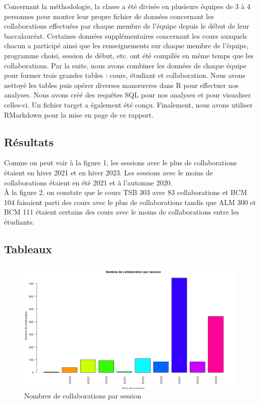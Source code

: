 \documentclass[9pt,twocolumn,twoside,]{pnas-new}
\begin{document}
Concernant la méthodologie, la classe a été divisée en plusieurs équipes
de 3 à 4 personnes pour monter leur propre fichier de données concernant
les collaborations effectuées par chaque membre de l'équipe depuis le
début de leur baccalauréat. Certaines données supplémentaires concernant
les cours auxquels chacun a participé ainsi que les renseignements sur
chaque membre de l'équipe, programme choisi, session de début, etc. ont
été compilés en même temps que les collaborations. Par la suite, nous
avons combiner les données de chaque équipe pour former trois grandes
tables : cours, étudiant et collaboration. Nous avons nettoyé les tables
puis opérer diverses manœuvres dans R pour effectuer nos analyses. Nous
avons créé des requêtes SQL pour nos analyses et pour visualiser
celles-ci. Un fichier target a également été conçu. Finalement, nous
avons utiliser RMarkdown pour la mise en page de ce rapport.

\hypertarget{Ruxe9sultats}{%
\subsection*{Résultats}\label{Ruxe9sultats}}

Comme on peut voir à la figure 1, les sessions avec le plus de
collaborations étaient en hiver 2021 et en hiver 2023. Les sessions avec
le moins de collaborations étaient en été 2021 et à l'automne 2020.\\
À la figure 2, on constate que le cours TSB 303 avec 83 collaborations
et BCM 104 faisaient parti des cours avec le plus de collaborations
tandis que ALM 300 et BCM 111 étaient certains des cours avec le moins
de collaborations entre les étudiants.

\hypertarget{references}{%
\subsection*{Tableaux}\label{references}}

\begin{figure}
  \centering
  \includegraphics[width=\linewidth]{session.png}
  \caption{Nombres de collaborations par session}
  \label{fig:session}
\end{figure}
\end{document}
